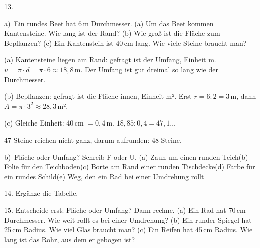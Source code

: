 \documentclass[11pt]{article}
\newcommand{\grau}[1]{{\color{mbgrau}#1}}
\begin{document}
\begin{pfaufg}{}{13.}{}
\grau{a)\ Ein rundes Beet hat 6\,m Durchmesser. (a) Um das Beet kommen Kantensteine. Wie lang ist der Rand? (b) Wie groß ist die Fläche zum Bepflanzen? (c) Ein Kantenstein ist 40\,cm lang. Wie viele Steine braucht man?\par\smallskip (a) Kantensteine liegen am Rand: gefragt ist der Umfang, Einheit m. $u = \pi \cdot d = \pi \cdot 6 \approx 18{,}8$\,m. Der Umfang ist gut dreimal so lang wie der Durchmesser.\par (b) Bepflanzen: gefragt ist die Fläche innen, Einheit m². Erst $r = 6 : 2 = 3$\,m, dann $A = \pi \cdot 3^2 \approx 28{,}3$\,m².\par (c) Gleiche Einheit: 40\,cm $= 0{,}4$\,m. $18{,}85 : 0{,}4 = 47{,}1\ldots$\par 47 Steine reichen nicht ganz, darum aufrunden: 48 Steine.}
\par\medskip
b)\ Fläche oder Umfang? Schreib F oder U. (a) Zaun um einen runden Teich\quad (b) Folie für den Teichboden\quad (c) Borte am Rand einer runden Tischdecke\quad (d) Farbe für ein rundes Schild\quad (e) Weg, den ein Rad bei einer Umdrehung rollt
\end{pfaufg}

\begin{pfaufg}{}{14.}{}
Ergänze die Tabelle.
\end{pfaufg}

\begin{pfaufg}{}{15.}{}
Entscheide erst: Fläche oder Umfang? Dann rechne. (a) Ein Rad hat 70\,cm Durchmesser. Wie weit rollt es bei einer Umdrehung? (b) Ein runder Spiegel hat 25\,cm Radius. Wie viel Glas braucht man? (c) Ein Reifen hat 45\,cm Radius. Wie lang ist das Rohr, aus dem er gebogen ist?
\end{pfaufg}
\end{document}
